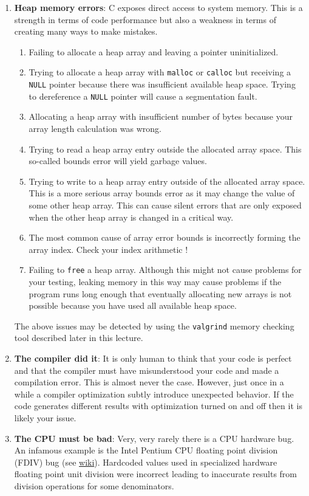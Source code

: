 \begin{enumerate}
   \item {\bf Heap memory errors}: C exposes direct access to system memory. This is a strength in terms of code performance but also a weakness in terms of creating many ways to make mistakes.
   \begin{enumerate}
       \item Failing to allocate a heap array and leaving a pointer uninitialized. 
       \item Trying to allocate a heap array with \texttt{malloc} or \texttt{calloc} but receiving a \texttt{NULL} pointer because there was insufficient available heap space. Trying to dereference a \texttt{NULL} pointer will cause a segmentation fault. 
       \item Allocating a heap array with insufficient number of bytes because your array length calculation was wrong.
       \item Trying to read a heap array entry outside the allocated array space. This so-called bounds error will yield garbage values.
       \item Trying to write to a heap array entry outside of the allocated array space. This is a more serious array bounds error as it may change the value of some other heap array. This can cause silent errors that are only exposed when the other heap array is changed in a critical way.
       \item The most common cause of array error bounds is incorrectly forming the array index. Check your index arithmetic !
       \item Failing to \texttt{free} a heap array. Although this might not cause problems for your testing, leaking memory in this way may cause problems if the program runs long enough that eventually allocating new arrays is not possible because you have used all available heap space.
       
   \end{enumerate}
   The above issues may be detected by using the \texttt{valgrind} memory checking tool described later in this lecture.
    \item {\bf The compiler did it}: It is only human to think that your code is perfect and that the compiler must have misunderstood your code and made a compilation error. This is almost never the case. However, just once in a while a compiler optimization subtly introduce unexpected behavior. If the code generates different results with optimization turned on and off then it is likely your issue.
    
    \item {\bf The CPU must be bad}: Very, very rarely  there is a CPU hardware bug. An infamous example is the Intel Pentium CPU floating point division (FDIV) bug (see \href{https://en.wikipedia.org/wiki/Pentium_FDIV_bug}{wiki}). Hardcoded values used in specialized hardware floating point unit division  were incorrect leading to inaccurate results from division operations for some denominators. 
    
\end{enumerate}


